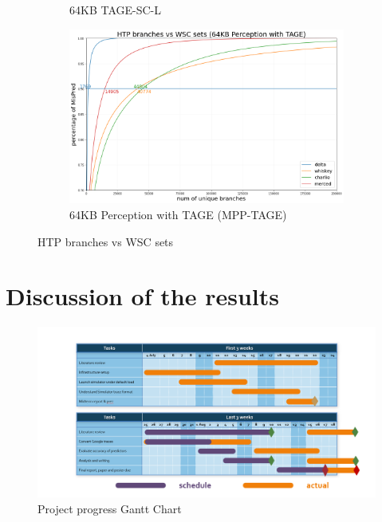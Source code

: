 \begin{figure}[h!]
\begin{subfigure}{0.45\textwidth}
         \caption{64KB TAGE-SC-L}
     \end{subfigure}
     \begin{subfigure}{0.45\textwidth}
         \centering
         \includegraphics[width=1\textwidth]{Chapter3/Figs/HTP branches vs WSC sets (64KB Perception with TAGE).png}
         \caption{64KB Perception with TAGE (MPP-TAGE)}
     \end{subfigure}
     
\caption{HTP branches vs WSC sets}
\label{fig:HTP branches vs WSC sets}
\end{figure} %
\label{MPKI results}

\newpage
\section{Discussion of the results}
\label{result discussion}

\begin{figure}[h!] 
\centering    
\includegraphics[width=1\textwidth]{Chapter3/Figs/final gantt chart.png}
\caption{\centering Project progress Gantt Chart}
\label{fig:gantt chart}
\end{figure}

